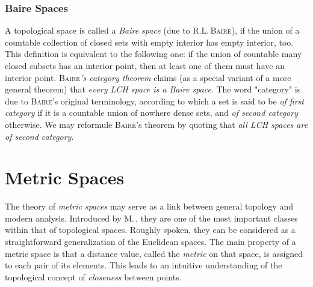 \documentclass[11pt,twoside]{article}
\begin{document}
\section{Baire Spaces}                                                         %
A topological space is called a \textit{Baire space}
(due to \textsc{R.L.\,Baire}),
if the union of a countable collection of closed sets with empty interior
has empty interior, too.
This definition is equivalent to the following one:
if the union of countable many closed subsets has an interior point,
then at least one of them must have an interior point.
\textsc{Baire}\textit{'s category theorem} claims
(as a special variant of a more general theorem)
that \textit{every LCH space is a Baire space}.
The word "category" is due to \textsc{Baire}'s original terminology,
according to which a set is said to be \textit{of first category}
if it is a countable union of nowhere dense sets,
and \textit{of second category} otherwise.
We may reformule \textsc{Baire}'s theorem by quoting
that \textit{all LCH spaces are of second category}.

\part{Metric Spaces}                                                           %
The theory of \textit{metric spaces} may serve as a link
between general topology and modern analysis.
Introduced by \textsc{M.\,{\FRECHET}},
they are one of the most important classes within that of topological spaces.
Roughly spoken,
they can be considered as a straightforward generalization
of the Euclidean spaces.
The main property of a metric space is
that a distance value, called the \textit{metric} on that space,
is assigned to each pair of its elements.
This leads to an intuitive understanding
of the topological concept of \textit{closeness} between points.
\end{document}

